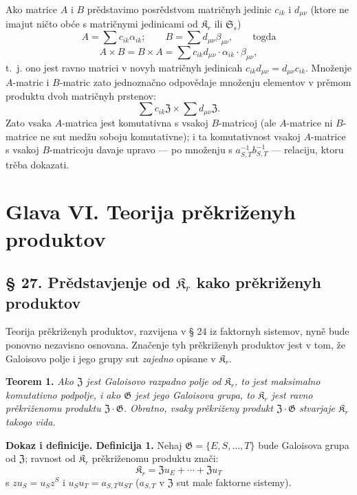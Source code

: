 \documentclass[11pt]{article}
\begin{document}
Ako matrice \(A\) i \(B\) prědstavimo posrědstvom matričnyh jedinic \(c_{ik}\) i \(d_{\mu\nu}\) (ktore ne imajut ničto obće s matričnymi jedinicami od \(\mathfrak K_r\) ili \(\mathfrak S_s\))
\[
A=\sum c_{ik}\alpha_{ik};\qquad
B=\sum d_{\mu\nu}\beta_{\mu\nu},\qquad\text{togda}
\]
\[
A\times B=B\times A
=\sum c_{ik}d_{\mu\nu}\cdot\alpha_{ik}\cdot\beta_{\mu\nu},
\]
t.~j. ono jest ravno matrici v novyh matričnyh jedinicah
\(c_{ik}d_{\mu\nu}=d_{\mu\nu}c_{ik}\). Množenje \(A\)-matric i \(B\)-matric zato jednoznačno odpovědaje množenju elementov v prěmom produktu dvoh matričnyh prstenov:
\[
\sum c_{ik}\mathfrak Z\times\sum d_{\mu\nu}\mathfrak Z.
\]
Zato vsaka \(A\)-matrica jest komutativna s vsakoj \(B\)-matricoj (ale \(A\)-matrice ni \(B\)-matrice ne sut medžu soboju komutativne); i ta komutativnost vsakoj \(A\)-matrice s vsakoj \(B\)-matricoju davaje upravo --- po množenju s \(a_{S,T}^{-1}b_{S,T}^{-1}\) --- relaciju, ktoru trěba dokazati.

\section*{Glava VI. Teorija prěkriženyh produktov}\label{kapitel-vi.-theorie-der-verschraenkten-produkte}

\subsection*{§ 27. Prědstavjenje od \(\mathfrak K_r\) kako prěkriženyh produktov}

Teorija prěkriženyh produktov, razvijena v § 24 iz faktornyh sistemov, nyně bude ponovno nezavisno osnovana. Značenje tyh prěkriženyh produktov jest v tom, že Galoisovo polje i jego grupy sut \emph{zajedno} opisane v \(\mathfrak K_r\).

\noindent\textbf{Teorem 1.} \emph{Ako \(\mathfrak Z\) jest Galoisovo razpadno polje od \(\mathfrak K_r\), to jest maksimalno komutativno podpolje, i ako \(\mathfrak G\) jest jego Galoisova grupa, to \(\mathfrak K_r\) jest ravno prěkriženomu produktu \(\mathfrak Z\cdot\mathfrak G\). Obratno, vsaky prěkriženy produkt \(\mathfrak Z\cdot\mathfrak G\) stvarjaje \(\mathfrak K_r\) takogo vida.}

\noindent\textbf{Dokaz i definicije. Definicija 1.} Nehaj \(\mathfrak G=\{E,S,\ldots,T\}\) bude Galoisova grupa od \(\mathfrak Z\); ravnost od \(\mathfrak K_r\) prěkriženomu produktu znači:
\[
\mathfrak K_r=\mathfrak Zu_E+\cdots+\mathfrak Zu_T
\]
s \(zu_S=u_Sz^S\) i \(u_Su_T=a_{S,T}u_{ST}\) (\(a_{S,T}\) v \(\mathfrak Z\) sut male faktorne sistemy).
\end{document}
